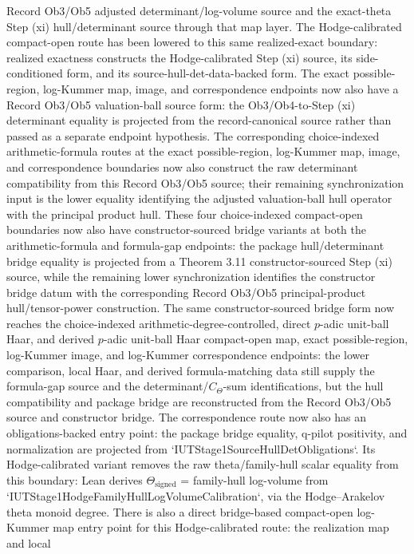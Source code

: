 \documentclass[11pt]{article}
\theoremstyle{plain}
\theoremstyle{definition}
\theoremstyle{remark}
\begin{document}
Record Ob3/Ob5 adjusted determinant/log-volume source and the exact-theta Step
(xi) hull/determinant source through that map layer.  The Hodge-calibrated
compact-open route has been lowered to this same realized-exact boundary:
realized exactness constructs the Hodge-calibrated Step (xi) source, its
side-conditioned form, and its source-hull-det-data-backed form.  The
exact possible-region, log-Kummer map, image, and correspondence endpoints now
also have a Record Ob3/Ob5 valuation-ball source form: the Ob3/Ob4-to-Step
(xi) determinant equality is projected from the record-canonical source rather
than passed as a separate endpoint hypothesis.  The corresponding
choice-indexed arithmetic-formula routes at the exact possible-region,
log-Kummer map, image, and correspondence boundaries now also construct the
raw determinant compatibility from this Record Ob3/Ob5 source; their remaining
synchronization input is the lower equality identifying the adjusted
valuation-ball hull operator with the principal product hull.  These four
choice-indexed compact-open boundaries now also have constructor-sourced bridge
variants at both the arithmetic-formula and formula-gap endpoints: the package
hull/determinant bridge equality is projected from a Theorem 3.11
constructor-sourced Step (xi) source, while the remaining lower synchronization
identifies the constructor bridge datum with the corresponding Record Ob3/Ob5
principal-product hull/tensor-power construction.  The same constructor-sourced
bridge form now reaches the choice-indexed arithmetic-degree-controlled,
direct \(p\)-adic unit-ball Haar, and derived \(p\)-adic unit-ball Haar
compact-open map, exact possible-region, log-Kummer image, and log-Kummer
correspondence endpoints: the lower comparison, local Haar, and derived
formula-matching data still supply the formula-gap source and the
determinant/\(C_\Theta\)-sum identifications, but the hull compatibility and
package bridge are reconstructed from the Record Ob3/Ob5 source and
constructor bridge.  The
correspondence route now also has an obligations-backed entry point: the
package bridge equality, q-pilot positivity, and normalization are projected
from `IUTStage1SourceHullDetObligations`.  Its Hodge-calibrated variant
removes the raw theta/family-hull scalar equality from this boundary: Lean
derives \(\Theta_{\mathrm{signed}}\) = family-hull log-volume from
`IUTStage1HodgeFamilyHullLogVolumeCalibration`, via the Hodge--Arakelov theta
monoid degree.  There is also a direct bridge-based compact-open log-Kummer map
entry point for this Hodge-calibrated route: the realization map and local
\end{document}

